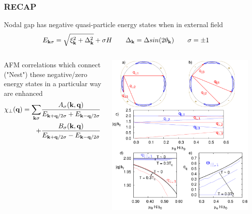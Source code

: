 \documentclass{beamer}
\newcommand\vk{\bold{k}}
\newcommand\vq{\bold{q}}
\begin{document}
\begin{frame} \frametitle{RECAP}
Nodal gap has negative quasi-particle energy states when in external field
\begin{equation}
E_{\vk\sigma} = \sqrt{\xi_\vk^2 + \Delta_\vk^2} + \sigma H \quad\quad \Delta_\vk = \Delta sin(2\theta_\vk)\quad\quad \sigma = \pm 1
\end{equation}
\begin{columns}
	\begin{column}{0.5\textwidth}
    		AFM correlations which connect ("Nest") these negative/zero energy states in a particular way are enhanced
    		\begin{eqnarray}
    			\chi_{\perp}(\vq) = \sum\limits_{\vk\sigma} &\frac{A_\sigma(\vk,\vq)}{E_{\vk+\vq/2 \sigma} + E_{\vk-\vq/2 \sigma}} \\
    			 + & \frac{B_\sigma(\vk,\vq)}{E_{\vk+\vq/2 \sigma} - E_{\vk-\vq/2 \bar{\sigma}}}
    		\end{eqnarray}
    \end{column}
    \begin{column}{0.5\textwidth}
      	\includegraphics[scale=0.3]{Fig2.eps}
    \end{column}
  \end{columns}
\end{frame}
\end{document}
